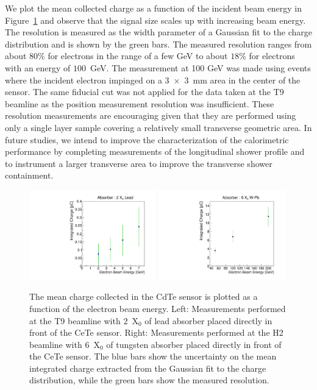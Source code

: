 We plot the mean collected charge as a function of the incident beam energy
in Figure~\ref{fig:ChargeVsEnergy} and observe that the signal size scales
up with increasing beam energy. The resolution is measured as the width
parameter of a Gaussian fit to the charge distribution and is shown by the green bars. 
The measured resolution ranges from
about $80\%$ for electrons in the range of a few GeV to 
about $18\%$ for electrons with an energy of $100$~GeV.
The measurement at 100 GeV was made using events where the incident electron impinged on
a 3~$\times$~3~mm area in the center of the sensor. 
%         
%
The same fiducial cut was not applied
for the data taken at the T9 beamline as the position measurement resolution was insufficient.
These resolution measurements are encouraging given that they are performed
using only a single layer sample covering a relatively small transverse
geometric area. In future studies, we intend to improve the characterization
of the calorimetric performance by completing measurements of the
longitudinal shower profile and to instrument a larger transverse 
area to improve the transverse shower containment. 

\begin{figure}[htbp] 
\centering
\includegraphics[width=0.49\textwidth]{figures/ChargeVsEnergyAt2X0.pdf} 
\includegraphics[width=0.49\textwidth]{figures/ChargeVsEnergyAt6X0.pdf} 
\caption{ The mean charge collected in the CdTe sensor is plotted as a function
of the electron beam energy. Left: Measurements performed at the T9 beamline
with $2$~$\mathrm{X}_{0}$ of lead absorber placed directly in front of the 
CeTe sensor. Right: Measurements performed at the H2 beamline
with $6$~$\mathrm{X}_{0}$ of tungsten absorber placed directly in front of the 
CeTe sensor. The blue bars show the uncertainty on the mean integrated charge
extracted from the Gaussian fit to the charge distribution, while the green 
bars show the measured resolution. } 
\label{fig:ChargeVsEnergy} 
\end{figure} 


